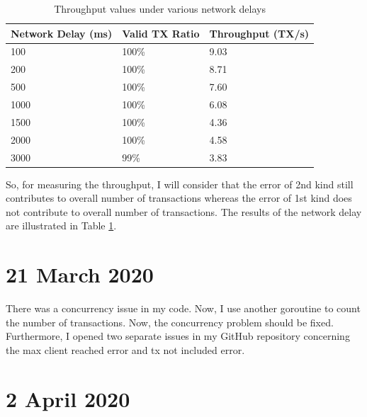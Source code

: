 \documentclass{article}
\begin{document}
\begin{table}[ht]
    \centering
    \caption{Throughput values under various network delays}
    \begin{tabular}{|l|l|l|}
    \hline
    \textbf{Network Delay (ms)} & \textbf{Valid TX Ratio} & \textbf{Throughput (TX/s)} \\ \hline
    100                         & 100\%                   & 9.03                       \\ \hline
    200                         & 100\%                   & 8.71                       \\ \hline
    500                         & 100\%                   & 7.60                       \\ \hline
    1000                        & 100\%                   & 6.08                       \\ \hline
    1500                        & 100\%                   & 4.36                       \\ \hline
    2000                        & 100\%                   & 4.58                       \\ \hline
    3000                        & 99\%                    & 3.83                       \\ \hline
    \end{tabular}
    \label{tab:Network delay throughput}
\end{table}

So, for measuring the throughput, I will consider that the error of 2nd kind still contributes to overall number of transactions whereas the error of 1st kind does not contribute to overall number of transactions. The results of  the network delay are illustrated in Table \ref{tab:Network delay throughput}.

\section*{21 March 2020}

There was a concurrency issue in my code. Now, I use another goroutine to count the number of transactions. Now, the concurrency problem should be fixed. Furthermore, I opened two separate issues in my GitHub repository concerning the max client reached error and tx not included error.

\section*{2 April 2020}
\end{document}
